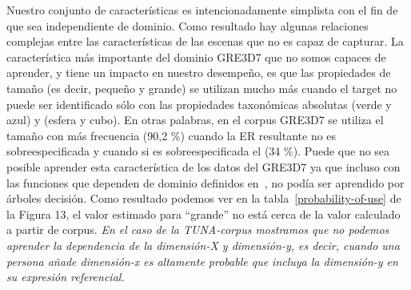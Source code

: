 Nuestro conjunto de caracter\'{i}sticas es intencionadamente simplista con el fin de que sea
independiente de dominio. Como resultado hay algunas relaciones complejas
entre las caracter\'{i}sticas de las escenas que no es capaz de
capturar. La caracter\'{i}stica m\'as importante del dominio GRE3D7
que no somos capaces de aprender, y tiene un impacto en nuestro desempe\~no, es que
las propiedades de tama\~no (es decir, peque\~no y grande) se utilizan mucho
m\'as cuando el target no puede ser identificado s\'olo con las propiedades taxon\'omicas absolutas 
(verde y azul) y (esfera y cubo). En otras palabras, en el corpus GRE3D7 se utiliza el tama\~no con m\'as frecuencia (90,2 \%)
cuando la ER resultante no es sobreespecificada y cuando si es sobreespecificada el (34 \%). 
Puede que no sea posible aprender esta caracter\'{i}stica de los
datos del GRE3D7 ya que incluso con las funciones que dependen de dominio definidos
en~\cite[Cap\'{i}tulo 6] {viet:gene11}, no pod\'{i}a ser aprendido por \'arboles decisi\'on. 
Como resultado podemos ver en la tabla~\ref{probability-of-use} de la Figura 13, el valor estimado para 
``grande'' no est\'a cerca de la
valor calculado a partir de corpus. \textit{En el caso de la TUNA-corpus
  mostramos que no podemos aprender la dependencia de la dimensi\'on-X y
  dimensi\'on-y, es decir, cuando una persona a\~nade dimensi\'on-x es altamente
  probable que incluya la dimensi\'on-y en su expresi\'on referencial.}


